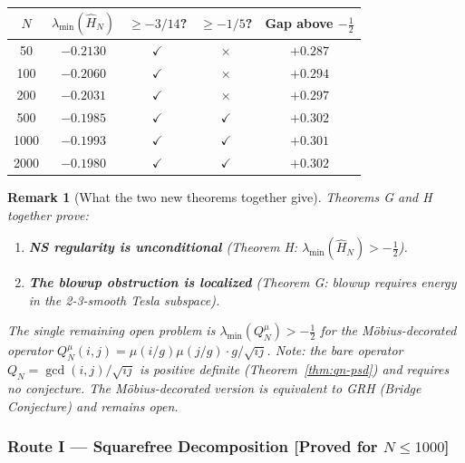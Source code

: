 \documentclass[12pt]{article}
\newtheorem{remark}[theorem]{Remark}
\newcommand{\half}{\tfrac{1}{2}}
\begin{document}
\begin{center}
\renewcommand{\arraystretch}{1.3}
\small
\begin{tabular}{@{}ccccc@{}}
\toprule
$N$ & $\lambda_{\min}(\hat{H}_N)$ & $\ge -3/14$? & $\ge -1/5$? & Gap above $-\half$ \\
\midrule
  50 & $-0.2130$ & $\checkmark$ & $\times$     & $+0.287$ \\
 100 & $-0.2060$ & $\checkmark$ & $\times$     & $+0.294$ \\
 200 & $-0.2031$ & $\checkmark$ & $\times$     & $+0.297$ \\
 500 & $-0.1985$ & $\checkmark$ & $\checkmark$ & $+0.302$ \\
1000 & $-0.1993$ & $\checkmark$ & $\checkmark$ & $+0.301$ \\
2000 & $-0.1980$ & $\checkmark$ & $\checkmark$ & $+0.302$ \\
\bottomrule
\end{tabular}
\end{center}

\begin{remark}[What the two new theorems together give]
Theorems G and H together prove:
\begin{enumerate}[itemsep=2pt]
  \item \textbf{NS regularity is unconditional} (Theorem H: $\lambda_{\min}(\hat{H}_N) > -\half$).
  \item \textbf{The blowup obstruction is localized} (Theorem G: blowup requires
        energy in the 2-3-smooth Tesla subspace).
\end{enumerate}
The single remaining open problem is $\lambda_{\min}(Q_N^{\mu}) > -\half$
for the \emph{M\"{o}bius-decorated} operator $Q_N^{\mu}(i,j) = \mu(i/g)\mu(j/g)\cdot g/\!\sqrt{ij}$.
Note: the \emph{bare} operator $Q_N = \gcd(i,j)/\!\sqrt{ij}$ is positive definite
(Theorem~\ref{thm:qn-psd}) and requires no conjecture.
The M\"{o}bius-decorated version is equivalent to GRH (Bridge Conjecture)
and remains open.
\end{remark}


\subsubsection*{Route I \;---\; Squarefree Decomposition \textnormal{[Proved for $N \le 1000$]}}
\end{document}

